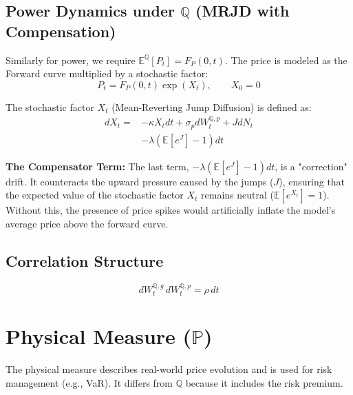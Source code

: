 \documentclass{article}
\begin{document}
\subsection{Power Dynamics under $\mathbb Q$ (MRJD with Compensation)}

Similarly for power, we require $\mathbb E^{\mathbb Q}[P_t] = F_P(0,t)$. The price is modeled as the Forward curve multiplied by a stochastic factor:
\begin{equation}
P_t = F_P(0,t)\exp(X_t),
\qquad X_0 = 0
\end{equation}

The stochastic factor $X_t$ (Mean-Reverting Jump Diffusion) is defined as:
\begin{equation}
\boxed{
\begin{aligned}
dX_t = {} & -\kappa X_t dt
+ \sigma_p dW_t^{\mathbb Q,p}
+ J dN_t \\
& - \lambda\left(\mathbb E[e^{J}] - 1\right)dt
\end{aligned}
}
\end{equation}

\textbf{The Compensator Term:}
The last term, $- \lambda(\mathbb E[e^{J}] - 1)dt$, is a "correction" drift. It counteracts the upward pressure caused by the jumps ($J$), ensuring that the expected value of the stochastic factor $X_t$ remains neutral ($\mathbb E[e^{X_t}]=1$). Without this, the presence of price spikes would artificially inflate the model's average price above the forward curve.

\subsection{Correlation Structure}

\begin{equation}
dW_t^{\mathbb Q,g} \, dW_t^{\mathbb Q,p} = \rho \, dt
\end{equation}

\section{Physical Measure ($\mathbb P$)}

The physical measure describes real-world price evolution and is used for risk management (e.g., VaR). It differs from $\mathbb Q$ because it includes the risk premium.
\end{document}
